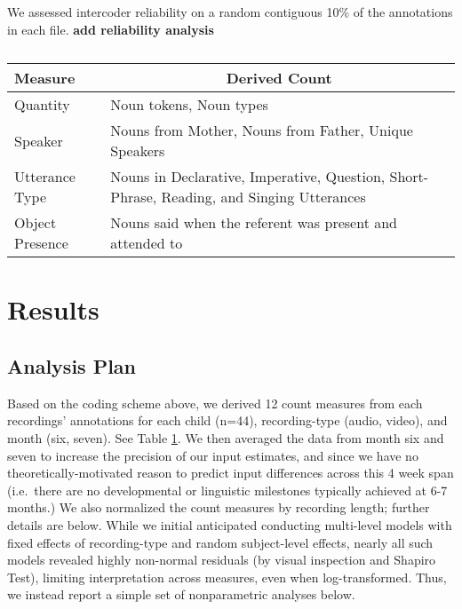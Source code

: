 \documentclass[floatsintext,man]{apa6}
\theoremstyle{definition}
\theoremstyle{definition}
\theoremstyle{definition}
\theoremstyle{remark}
\begin{document}
We assessed intercoder reliability on a random contiguous 10\% of the
annotations in each file. \textbf{add reliability analysis}

\begin{table}[tbp]
\begin{center}
\begin{threeparttable}
\caption{\label{tab:measures-tab}}
\begin{tabular}{ll}
\toprule
Measure & \multicolumn{1}{c}{Derived Count}\\
\midrule
Quantity & Noun tokens, Noun types\\
Speaker & Nouns from Mother, Nouns from Father, Unique Speakers\\
Utterance Type & Nouns in Declarative, Imperative, Question, Short-Phrase, Reading, and Singing Utterances\\
Object Presence & Nouns said when the referent was present and attended to\\
\bottomrule
\end{tabular}
\end{threeparttable}
\end{center}
\end{table}

\hypertarget{results}{%
\section{Results}\label{results}}

\hypertarget{analysis-plan}{%
\subsection{Analysis Plan}\label{analysis-plan}}

Based on the coding scheme above, we derived 12 count measures from each
recordings' annotations for each child (n=44), recording-type (audio,
video), and month (six, seven). See Table \ref{tab:measures-tab}. We
then averaged the data from month six and seven to increase the
precision of our input estimates, and since we have no
theoretically-motivated reason to predict input differences across this
4 week span (i.e.~there are no developmental or linguistic milestones
typically achieved at 6-7 months.) We also normalized the count measures
by recording length; further details are below. While we initial
anticipated conducting multi-level models with fixed effects of
recording-type and random subject-level effects, nearly all such models
revealed highly non-normal residuals (by visual inspection and Shapiro
Test), limiting interpretation across measures, even when
log-transformed. Thus, we instead report a simple set of nonparametric
analyses below.
\end{document}
